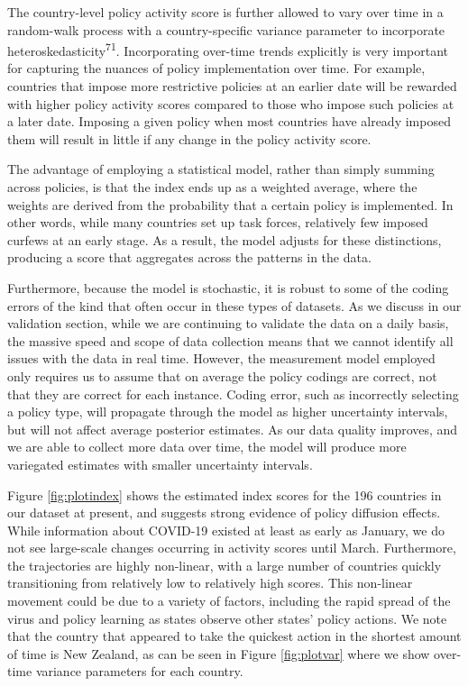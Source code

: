 \documentclass[]{article}
\begin{document}
The country-level policy activity score is further allowed to vary over time in a random-walk process with a country-specific variance parameter to incorporate heteroskedasticity\textsuperscript{71}. Incorporating over-time trends explicitly is very important for capturing the nuances of policy implementation over time. For example, countries that impose more restrictive policies at an earlier date will be rewarded with higher policy activity scores compared to those who impose such policies at a later date. Imposing a given policy when most countries have already imposed them will result in little if any change in the policy activity score.

The advantage of employing a statistical model, rather than simply summing across policies, is that the index ends up as a weighted average, where the weights are derived from the probability that a certain policy is implemented. In other words, while many countries set up task forces, relatively few imposed curfews at an early stage. As a result, the model adjusts for these distinctions, producing a score that aggregates across the patterns in the data.

Furthermore, because the model is stochastic, it is robust to some of the coding errors of the kind that often occur in these types of datasets. As we discuss in our validation section, while we are continuing to validate the data on a daily basis, the massive speed and scope of data collection means that we cannot identify all issues with the data in real time. However, the measurement model employed only requires us to assume that on average the policy codings are correct, not that they are correct for each instance. Coding error, such as incorrectly selecting a policy type, will propagate through the model as higher uncertainty intervals, but will not affect average posterior estimates. As our data quality improves, and we are able to collect more data over time, the model will produce more variegated estimates with smaller uncertainty intervals.

Figure \ref{fig:plotindex} shows the estimated index scores for the 196 countries in our dataset at present, and suggests strong evidence of policy diffusion effects. While information about COVID-19 existed at least as early as January, we do not see large-scale changes occurring in activity scores until March. Furthermore, the trajectories are highly non-linear, with a large number of countries quickly transitioning from relatively low to relatively high scores. This non-linear movement could be due to a variety of factors, including the rapid spread of the virus and policy learning as states observe other states' policy actions. We note that the country that appeared to take the quickest action in the shortest amount of time is New Zealand, as can be seen in Figure \ref{fig:plotvar} where we show over-time variance parameters for each country.
\end{document}
